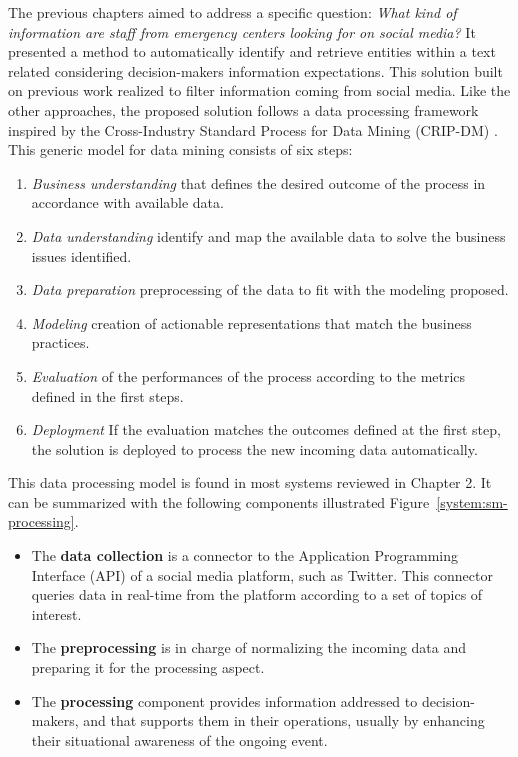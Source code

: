 The previous chapters aimed to address a specific question: \emph{What kind of information are staff from emergency centers looking for on social media?}
It presented a method to automatically identify and retrieve entities within a text related considering decision-makers information expectations.
This solution built on previous work realized to filter information coming from social media.
Like the other approaches, the proposed solution follows a data processing framework inspired by the Cross-Industry Standard Process for Data Mining (CRIP-DM) \parencite{martinez-plumedCRISPDMTwentyYears2021}.
This generic model for data mining consists of six steps:
\begin{enumerate}
    \item \emph{Business understanding} that defines the desired outcome of the process in accordance with available data.
    \item \emph{Data understanding} identify and map the available data to solve the business issues identified.
    \item \emph{Data preparation} preprocessing of the data to fit with the modeling proposed.
    \item \emph{Modeling} creation of actionable representations that match the business practices.
    \item \emph{Evaluation} of the performances of the process according to the metrics defined in the first steps.
    \item \emph{Deployment} If the evaluation matches the outcomes defined at the first step, the solution is deployed to process the new incoming data automatically.
\end{enumerate}

This data processing model is found in most systems reviewed in Chapter 2.
It can be summarized with the following components illustrated Figure~\ref{system:sm-processing}.

\begin{itemize}
    \item The \textbf{data collection} is a connector to the Application Programming Interface (API) of a social media platform, such as Twitter.
          This connector queries data in real-time from the platform according to a set of topics of interest.
    \item The \textbf{preprocessing} is in charge of normalizing the incoming data and preparing it for the processing aspect.
    \item The \textbf{processing} component provides information addressed to decision-makers, and that supports them in their operations, usually by enhancing their situational awareness of the ongoing event.
\end{itemize}

